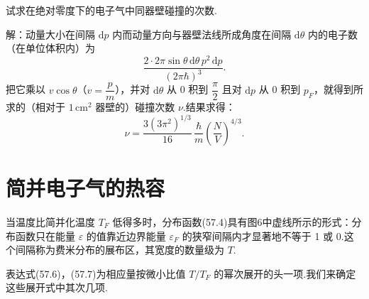 \begin{xiti}

\quad 试求在绝对零度下的电子气中同器壁碰撞的次数.

解：动量大小在间隔 $\mathrm{d}p$ 内而动量方向与器壁法线所成角度在间隔 $\mathrm{d}\theta$ 内的电子数（在单位体积内）为
\begin{equation*}
  \frac{2\cdot2\pi\sin\theta\,\mathrm{d}\theta\,p^2\,\mathrm{d}p}{(2\pi\hbar)^3}.
\end{equation*}
把它乘以 $v\cos\theta$（$v=\dfrac{p}{m}$），并对 $\mathrm{d}\theta$ 从 0 积到 $\dfrac{\pi}{2}$ 且对 $\mathrm{d}p$ 从 0 积到 $p_F$，就得到所求的（相对于 $1\,\mathrm{cm}^2$ 器壁的）碰撞次数 $\nu$.结果求得：
\begin{equation*}
  \nu=\frac{3\left(3\pi^2\right)^{1/3}}{16}\,\frac{\hbar}{m}
  \left(\frac{N}{V}\right)^{4/3}.
\end{equation*}

\end{xiti}

\section{简并电子气的热容}

当温度比简并化温度 $T_F$ 低得多时，分布函数(57.4)具有图6中虚线所示的形式：分布函数只在能量 $\varepsilon$ 的值靠近边界能量 $\varepsilon_F$ 的狭窄间隔内才显著地不等于 1 或 0.这个间隔称为费米分布的展布区，其宽度的数量级为 $T$.

表达式(57.6)，(57.7)为相应量按微小比值 $T/T_F$ 的幂次展开的头一项.我们来确定这些展开式中其次几项.

